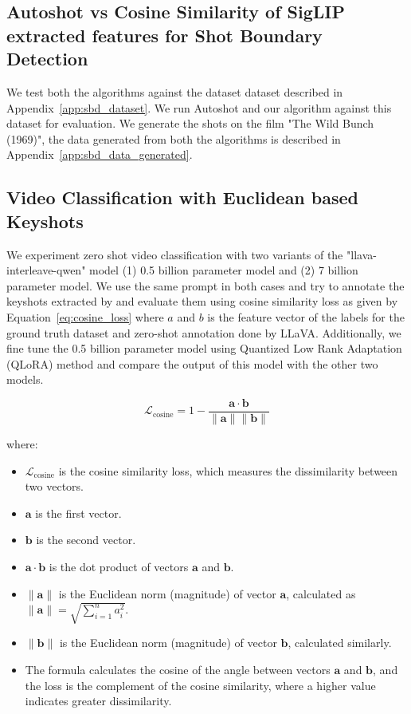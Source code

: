 \documentclass[12pt]{report}
\begin{document}
	\subsection{Autoshot vs Cosine Similarity of SigLIP extracted features for Shot Boundary Detection}
	
	We test both the algorithms against the dataset dataset described in Appendix~\ref{app:sbd_dataset}. We run Autoshot and our algorithm against this dataset for evaluation. We generate the shots on the film "The Wild Bunch (1969)", the data generated from both the algorithms is described in Appendix~\ref{app:sbd_data_generated}.
	\subsection{Video Classification with Euclidean based Keyshots}
	
	We experiment zero shot video classification with two variants of the "llava-interleave-qwen" model (1) 0.5 billion parameter model and (2) 7 billion parameter model. We use the same prompt in both cases and try to annotate the keyshots extracted by  and evaluate them using cosine similarity loss as given by Equation~\eqref{eq:cosine_loss} where $a$ and $b$ is the feature vector of the labels for the ground truth dataset and zero-shot annotation done by LLaVA. Additionally, we fine tune the 0.5 billion parameter model using Quantized Low Rank Adaptation (QLoRA) method and compare the output of this model with the other two models.
	
	\begin{equation}
		\mathcal{L}_{\text{cosine}} = 1 - \frac{\mathbf{a} \cdot \mathbf{b}}{\|\mathbf{a}\| \|\mathbf{b}\|}
		\label{eq:cosine_loss}
	\end{equation}
	
	where:
	\begin{itemize}
		\item \( \mathcal{L}_{\text{cosine}} \) is the cosine similarity loss, which measures the dissimilarity between two vectors.
		\item \( \mathbf{a} \) is the first vector.
		\item \( \mathbf{b} \) is the second vector.
		\item \( \mathbf{a} \cdot \mathbf{b} \) is the dot product of vectors \( \mathbf{a} \) and \( \mathbf{b} \).
		\item \( \|\mathbf{a}\| \) is the Euclidean norm (magnitude) of vector \( \mathbf{a} \), calculated as \( \|\mathbf{a}\| = \sqrt{\sum_{i=1}^{n} a_i^2} \).
		\item \( \|\mathbf{b}\| \) is the Euclidean norm (magnitude) of vector \( \mathbf{b} \), calculated similarly.
		\item The formula calculates the cosine of the angle between vectors \( \mathbf{a} \) and \( \mathbf{b} \), and the loss is the complement of the cosine similarity, where a higher value indicates greater dissimilarity.
	\end{itemize}
\end{document}
